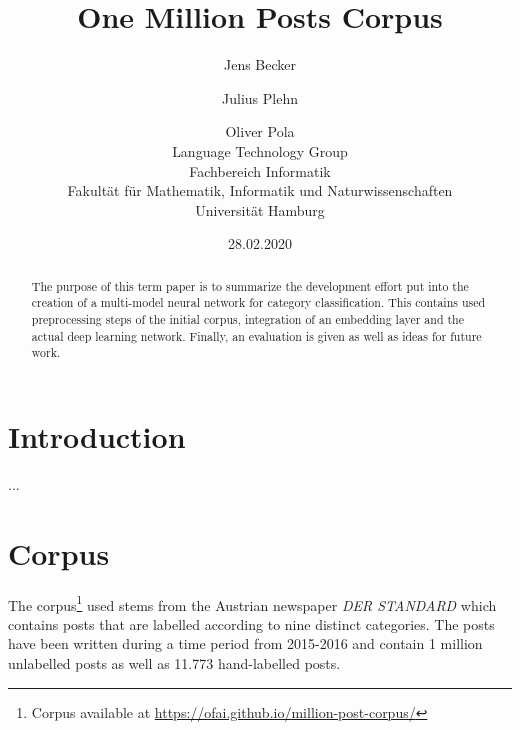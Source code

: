 \documentclass[11pt,a4paper]{article}
\title{One Million Posts Corpus}
\author{Jens Becker \and Julius Plehn \and Oliver Pola \\ 
	Language Technology Group \\
	Fachbereich Informatik \\
	Fakultät für Mathematik, Informatik und Naturwissenschaften \\
	Universität Hamburg
}
\date{28.02.2020}
\begin{document}
\maketitle
\begin{abstract}
The purpose of this term paper is to summarize the development effort put into the creation of a multi-model neural network for category classification. This contains used preprocessing steps of the initial corpus, integration of an embedding layer and the actual deep learning network. Finally, an evaluation is given as well as ideas for future work. 

 
\end{abstract}

\section{Introduction}

...~\cite{Schabus17, Schabus18}

\section{Corpus}
The corpus\footnote{Corpus available at \url{https://ofai.github.io/million-post-corpus/}} used stems from the Austrian newspaper \textit{DER STANDARD} which contains posts that are labelled according to nine distinct categories. The posts have been written during a time period from 2015-2016 and contain 1 million unlabelled posts as well as 11.773 hand-labelled posts.
\end{document}
